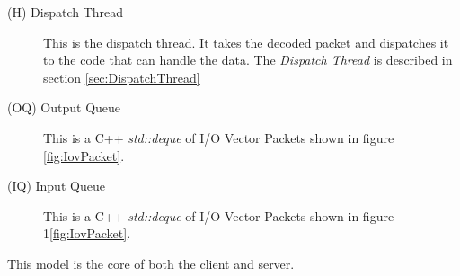 \begin{description}
\item[(H) Dispatch Thread]\label{DispatchThread}
	This is the dispatch thread.
  It takes the decoded packet and dispatches it to the code that can handle the data.
  The \textit{Dispatch Thread} is described in section \ref{sec:DispatchThread}

\item[(OQ) Output Queue]
  This is a C++ \textit{std::deque} of I/O Vector Packets
  shown in figure \ref{fig:IovPacket}.
  
\item[(IQ) Input Queue]
  This is a C++ \textit{std::deque} of I/O Vector Packets
  shown in figure 1\ref{fig:IovPacket}.
  
\end{description}


This model is the core of both the client and server.
